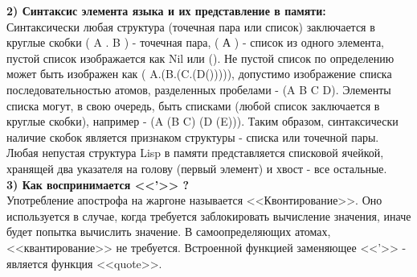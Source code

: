 \documentclass[a4paper, 12pt]{article}
\begin{document}
\hspace*{-5mm} \textbf{2) Синтаксис элемента языка и их представление в памяти:}
\\ \hspace*{5mm} Синтаксически любая структура (точечная пара или список) заключается в круглые скобки ( A . B ) - точечная пара, ( А ) - список из одного элемента, пустой список изображается как Nil или (). Не пустой список по определению может быть изображен как ( A.(B.(C.(D())))), допустимо изображение списка последовательностью атомов, разделенных пробелами - (A B C D). Элементы списка могут, в свою очередь, быть списками (любой список заключается в круглые скобки), например - (A (B C) (D (E))). Таким образом, синтаксически наличие скобок является признаком структуры - списка или точечной пары. 
\\ \hspace*{5mm} Любая непустая структура Lisp в памяти представляется списковой ячейкой, хранящей два указателя на голову (первый элемент) и хвост - все остальные. 
\\ \textbf{3) Как воспринимается <<'>> ?}
\\ \hspace*{5mm} Употребление апострофа на жаргоне называется <<Квонтирование>>. Оно используется в случае, когда требуется заблокировать вычисление значения, иначе будет попытка вычислить значение. В самоопределяющих атомах, <<квантирование>> не требуется. Встроенной функцией заменяющее <<'>> - является функция <<quote>>.

\clearpage
\newpage
\printbibliography
{}
\end{document}
